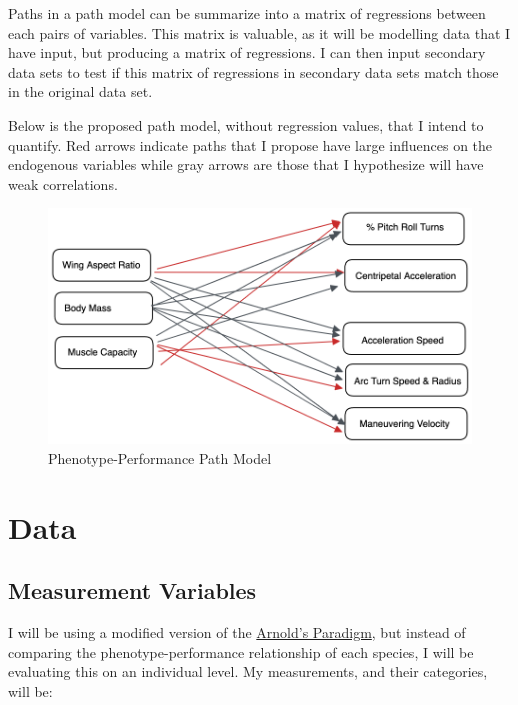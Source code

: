 \documentclass[
  letterpaper,
  DIV=11,
  numbers=noendperiod]{scrartcl}
\begin{document}
Paths in a path model can be summarize into a matrix of regressions
between each pairs of variables. This matrix is valuable, as it will be
modelling data that I have input, but producing a matrix of regressions.
I can then input secondary data sets to test if this matrix of
regressions in secondary data sets match those in the original data set.

Below is the proposed path model, without regression values, that I
intend to quantify. Red arrows indicate paths that I propose have large
influences on the endogenous variables while gray arrows are those that
I hypothesize will have weak correlations.

\begin{figure}

{\centering \includegraphics{path_model.png}

}

\caption{Phenotype-Performance Path Model}

\end{figure}

\hypertarget{data}{%
\section{Data}\label{data}}

\hypertarget{measurement-variables}{%
\subsection{Measurement Variables}\label{measurement-variables}}

I will be using a modified version of the
\protect\hyperlink{arnolds-paradigm}{Arnold's Paradigm}, but instead of
comparing the phenotype-performance relationship of each species, I will
be evaluating this on an individual level. My measurements, and their
categories, will be:
\end{document}
